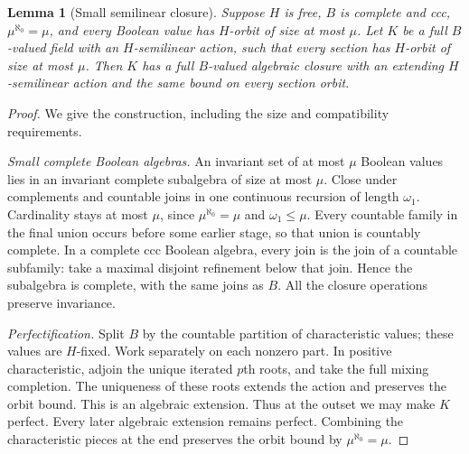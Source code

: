 \documentclass[11pt,a4paper]{article}
\newtheorem{lemma}[theorem]{Lemma}
\theoremstyle{definition}\newtheorem{definition}[theorem]{Definition}
\theoremstyle{remark}\newtheorem{remark}[theorem]{Remark}
\begin{document}
\begin{lemma}[Small semilinear closure]\label{lem:boolean-small-closure}
Suppose $H$ is free, $B$ is complete and ccc, $\mu^{\aleph_0}=\mu$, and every Boolean value has $H$-orbit of size at most $\mu$. Let $K$ be a full $B$-valued field with an $H$-semilinear action, such that every section has $H$-orbit of size at most $\mu$. Then $K$ has a full $B$-valued algebraic closure with an extending $H$-semilinear action and the same bound on every section orbit.
\end{lemma}
\begin{proof}
We give the construction, including the size and compatibility requirements.

\emph{Small complete Boolean algebras.} An invariant set of at most $\mu$ Boolean values lies in an invariant complete subalgebra of size at most $\mu$. Close under complements and countable joins in one continuous recursion of length $\omega_1$. Cardinality stays at most $\mu$, since $\mu^{\aleph_0}=\mu$ and $\omega_1\leq\mu$. Every countable family in the final union occurs before some earlier stage, so that union is countably complete. In a complete ccc Boolean algebra, every join is the join of a countable subfamily: take a maximal disjoint refinement below that join. Hence the subalgebra is complete, with the same joins as $B$. All the closure operations preserve invariance.

\emph{Perfectification.} Split $B$ by the countable partition of characteristic values; these values are $H$-fixed. Work separately on each nonzero part. In positive characteristic, adjoin the unique iterated $p$th roots, and take the full mixing completion. The uniqueness of these roots extends the action and preserves the orbit bound. This is an algebraic extension. Thus at the outset we may make $K$ perfect. Every later algebraic extension remains perfect. Combining the characteristic pieces at the end preserves the orbit bound by $\mu^{\aleph_0}=\mu$.


\end{proof}
\end{document}
